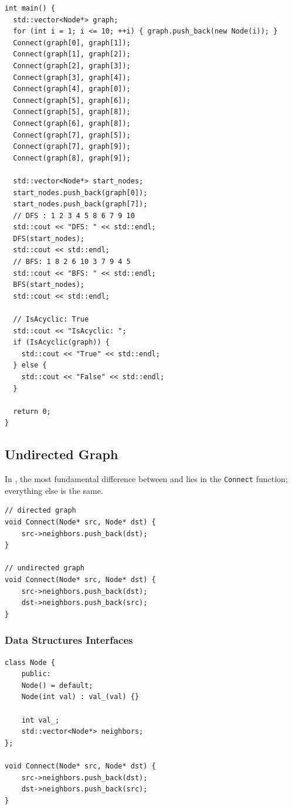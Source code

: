 \begin{lstlisting}
int main() {
  std::vector<Node*> graph;
  for (int i = 1; i <= 10; ++i) { graph.push_back(new Node(i)); }
  Connect(graph[0], graph[1]);
  Connect(graph[1], graph[2]);
  Connect(graph[2], graph[3]);
  Connect(graph[3], graph[4]);
  Connect(graph[4], graph[0]);
  Connect(graph[5], graph[6]);
  Connect(graph[5], graph[8]);
  Connect(graph[6], graph[8]);
  Connect(graph[7], graph[5]);
  Connect(graph[7], graph[9]);
  Connect(graph[8], graph[9]);

  std::vector<Node*> start_nodes;
  start_nodes.push_back(graph[0]);
  start_nodes.push_back(graph[7]);
  // DFS : 1 2 3 4 5 8 6 7 9 10
  std::cout << "DFS: " << std::endl;
  DFS(start_nodes);
  std::cout << std::endl;
  // BFS: 1 8 2 6 10 3 7 9 4 5
  std::cout << "BFS: " << std::endl;
  BFS(start_nodes);
  std::cout << std::endl;

  // IsAcyclic: True
  std::cout << "IsAcyclic: ";
  if (IsAcyclic(graph)) {
    std::cout << "True" << std::endl;
  } else {
    std::cout << "False" << std::endl;
  }

  return 0;
}
\end{lstlisting}

\subsection{Undirected Graph}
In {\color{blue}{adjacency list}}, the most fundamental difference between {\color{blue}{undirected graph}} and {\color{blue}{directed graph}} lies in the {\colorbox{CodeBackground}{\lstinline|Connect|}} function; everything else is the same.
\begin{lstlisting}
// directed graph
void Connect(Node* src, Node* dst) { 
	src->neighbors.push_back(dst);
}

// undirected graph
void Connect(Node* src, Node* dst) {
	src->neighbors.push_back(dst);
	dst->neighbors.push_back(src);
}
\end{lstlisting}

\subsubsection{Data Structures Interfaces}
\begin{lstlisting}
class Node {
	public:
	Node() = default;
	Node(int val) : val_(val) {}
	
	int val_;
	std::vector<Node*> neighbors;
};

void Connect(Node* src, Node* dst) {
	src->neighbors.push_back(dst);
	dst->neighbors.push_back(src);
}
\end{lstlisting}
